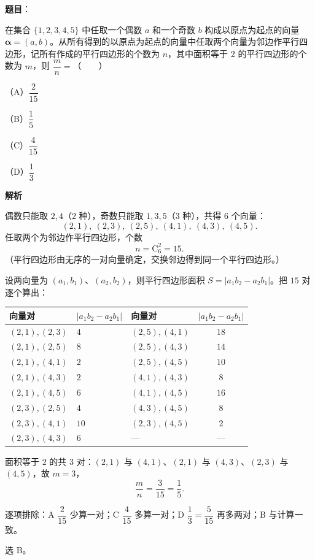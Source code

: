 \begin{answer}

\textbf{题目}：

在集合 $\{1,2,3,4,5\}$ 中任取一个偶数 $a$ 和一个奇数 $b$ 构成以原点为起点的向量 $\boldsymbol\alpha=(a,b)$。从所有得到的以原点为起点的向量中任取两个向量为邻边作平行四边形，记所有作成的平行四边形的个数为 $n$，其中面积等于 $2$ 的平行四边形的个数为 $m$，则 $\dfrac mn=$\mbox{（　　）}

（A）$\dfrac{2}{15}$

（B）$\dfrac15$

（C）$\dfrac{4}{15}$

（D）$\dfrac13$

\textbf{解析}

偶数只能取 $2,4$（$2$ 种），奇数只能取 $1,3,5$（$3$ 种），共得 $6$ 个向量：
\nopagebreak[4]
\[
(2,1),\ (2,3),\ (2,5),\ (4,1),\ (4,3),\ (4,5).
\]
任取两个为邻边作平行四边形，个数
\nopagebreak[4]
\[
n=\mathrm C_6^2=15.
\]
（平行四边形由无序的一对向量确定，交换邻边得到同一个平行四边形。）

设两向量为 $(a_1,b_1)$、$(a_2,b_2)$，则平行四边形面积 $S=|a_1b_2-a_2b_1|$。把 $15$ 对逐个算出：

\begin{center}
\begin{tabular}{lllc}
\toprule
向量对 & $\lvert a_1b_2-a_2b_1\rvert$ & 向量对 & $\lvert a_1b_2-a_2b_1\rvert$ \\
\midrule
$(2,1),(2,3)$ & $4$ & $(2,5),(4,1)$ & $18$ \\
$(2,1),(2,5)$ & $8$ & $(2,5),(4,3)$ & $14$ \\
$(2,1),(4,1)$ & $2$  & $(2,5),(4,5)$ & $10$ \\
$(2,1),(4,3)$ & $2$  & $(4,1),(4,3)$ & $8$ \\
$(2,1),(4,5)$ & $6$ & $(4,1),(4,5)$ & $16$ \\
$(2,3),(2,5)$ & $4$ & $(4,3),(4,5)$ & $8$ \\
$(2,3),(4,1)$ & $10$ & $(2,3),(4,5)$ & $2$  \\
$(2,3),(4,3)$ & $6$ & — & — \\
\bottomrule
\end{tabular}
\end{center}

面积等于 $2$ 的共 $3$ 对：$(2,1)$ 与 $(4,1)$、$(2,1)$ 与 $(4,3)$、$(2,3)$ 与 $(4,5)$，故 $m=3$，
\nopagebreak[4]
\[
\frac mn=\frac{3}{15}=\frac15.
\]

逐项排除：A $\dfrac{2}{15}$ 少算一对；C $\dfrac{4}{15}$ 多算一对；D $\dfrac13=\dfrac{5}{15}$ 再多两对；B 与计算一致。

选 B。


\end{answer}
